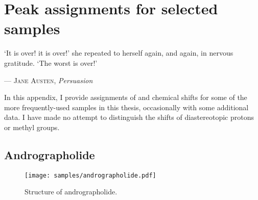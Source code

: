 \chapter{Peak assignments for selected samples}
\label{chpt:assignments}

\epigraph{\singlespacing%
`It is over! it is over!' she repeated to herself again, and again, in nervous gratitude. `The worst is over!'
}{--- \textsc{Jane Austen}, \textit{Persuasion}}

In this appendix, I provide assignments of \proton{} and \carbon{} chemical shifts for some of the more frequently-used samples in this thesis, occasionally with some additional data.
I have made no attempt to distinguish the shifts of diastereotopic protons or methyl groups.

\clearpage 

\section{Andrographolide}

\begin{figure}[!ht]
    \centering
    \texttt{[image: samples/andrographolide.pdf]}%
    \caption[Structure of andrographolide]{
        Structure of andrographolide.
    }
    \label{fig:samples_andrographolide}
\end{figure}


